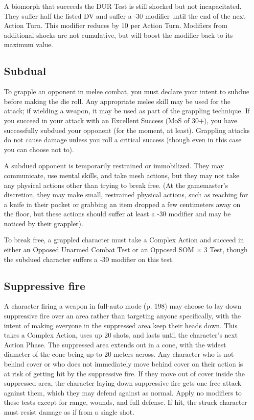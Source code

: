 A biomorph that succeeds the DUR Test is still shocked but not incapacitated. They suffer half the listed DV and suffer a -30 modifier until the end of the next Action Turn. This modifier reduces by 10 per Action Turn. Modifiers from additional shocks are not cumulative, but will boost the modifier back to its maximum value.


\subsection{Subdual}
\label{sec:subdual}

To grapple an opponent in melee combat, you must declare your intent to subdue before making the die roll. Any appropriate melee skill may be used for the attack; if wielding a weapon, it may be used as part of the grappling technique. If you succeed in your attack with an Excellent Success (MoS of 30+), you have successfully subdued your opponent (for the moment, at least). Grappling attacks do not cause damage unless you roll a critical success (though even in this case you can choose not to).

A subdued opponent is temporarily restrained or immobilized. They may communicate, use mental skills, and take mesh actions, but they may not take any physical actions other than trying to break free. (At the gamemaster’s discretion, they may make small, restrained physical actions, such as reaching for a knife in their pocket or grabbing an item dropped a few centimeters away on the floor, but these actions should suffer at least a -30 modifier and may be noticed by their grappler).

To break free, a grappled character must take a Complex Action and succeed in either an Opposed Unarmed Combat Test or an Opposed SOM $\times$ 3 Test, though the subdued character suffers a -30 modifier on this test.


\subsection{Suppressive fire}
\label{sec:suppressive-fire}

A character firing a weapon in full-auto mode (p. 198) may choose to lay down suppressive fire over an area rather than targeting anyone specifically, with the intent of making everyone in the suppressed area keep their heads down. This takes a Complex Action, uses up 20 shots, and lasts until the character’s next Action Phase. The suppressed area extends out in a cone, with the widest diameter of the cone being up to 20 meters across. Any character who is not behind cover or who does not immediately move behind cover on their action is at risk of getting hit by the suppressive fire. If they move out of cover inside the suppressed area, the character laying down suppressive fire gets one free attack against them, which they may defend against as normal. Apply no modifiers to these tests except for range, wounds, and full defense. If hit, the struck character must resist damage as if from a single shot.


